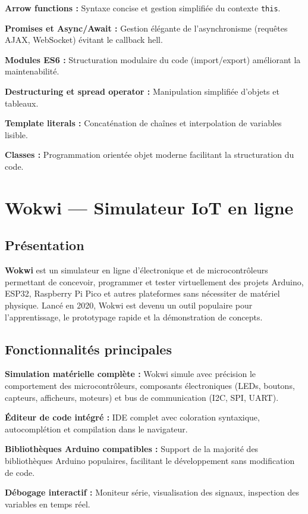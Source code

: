 \textbf{Arrow functions :} Syntaxe concise et gestion simplifiée du contexte \texttt{this}.

\textbf{Promises et Async/Await :} Gestion élégante de l'asynchronisme (requêtes AJAX, WebSocket) évitant le callback hell.

\textbf{Modules ES6 :} Structuration modulaire du code (import/export) améliorant la maintenabilité.

\textbf{Destructuring et spread operator :} Manipulation simplifiée d'objets et tableaux.

\textbf{Template literals :} Concaténation de chaînes et interpolation de variables lisible.

\textbf{Classes :} Programmation orientée objet moderne facilitant la structuration du code.


\section{Wokwi — Simulateur IoT en ligne}

\subsection{Présentation}

\textbf{Wokwi} est un simulateur en ligne d'électronique et de microcontrôleurs permettant de concevoir, programmer et tester virtuellement des projets Arduino, ESP32, Raspberry Pi Pico et autres plateformes sans nécessiter de matériel physique. Lancé en 2020, Wokwi est devenu un outil populaire pour l'apprentissage, le prototypage rapide et la démonstration de concepts.

\subsection{Fonctionnalités principales}

\textbf{Simulation matérielle complète :} Wokwi simule avec précision le comportement des microcontrôleurs, composants électroniques (LEDs, boutons, capteurs, afficheurs, moteurs) et bus de communication (I2C, SPI, UART).

\textbf{Éditeur de code intégré :} IDE complet avec coloration syntaxique, autocomplétion et compilation dans le navigateur.

\textbf{Bibliothèques Arduino compatibles :} Support de la majorité des bibliothèques Arduino populaires, facilitant le développement sans modification de code.

\textbf{Débogage interactif :} Moniteur série, visualisation des signaux, inspection des variables en temps réel.

